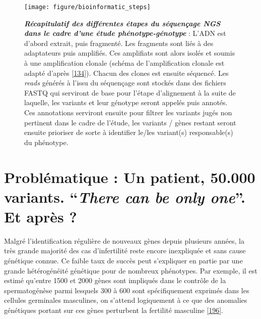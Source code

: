 \documentclass[12pt,a4paper,twoside]{ugathesis}
\theoremstyle{definition}
\theoremstyle{definition}
\theoremstyle{definition}
\theoremstyle{remark}
\begin{document}
\newpage 

\begin{figure}

{\centering \texttt{[image: figure/bioinformatic\_steps]} 

}

\caption[Récapitulatif des différentes étapes du séquençage NGS dans le cadre d'une étude phénotype-génotype]{\textbf{\emph{Récapitulatif des différentes
étapes du séquençage NGS dans le cadre d'une étude phénotype-génotype}}
: L'ADN est d'abord extrait, puis fragmenté. Les fragments sont liés à
des adaptateurs puis amplifiés. Ces amplifiats sont alors isolés et
soumis à une amplification clonale (schéma de l'amplification clonale
est adapté d'après {[}\protect\hyperlink{ref-Goodwin2016}{134}{]}).
Chacun des clones est ensuite séquencé. Les \emph{reads} générés à
l'issu du séquençage sont stockés dans des fichiers FASTQ qui serviront
de base pour l'étape d'alignement à la suite de laquelle, les variants
et leur génotype seront appelés puis annotés. Ces annotations serviront
ensuite pour filtrer les variants jugés non pertinent dans le cadre de
l'étude, les variants / gènes restant seront ensuite prioriser de sorte
à identifier le/les variant(s) responsable(s) du phénotype.}\label{fig:pictrecapngssteps}
\end{figure}















\newpage

\section{\texorpdfstring{Problématique : Un patient, 50.000 variants.
``\emph{There can be only one}''. Et après
?}{Problématique : Un patient, 50.000 variants. There can be only one. Et après ?}}\label{problematique-un-patient-50.000-variants.-there-can-be-only-one.-et-apres}

Malgré l'identification régulière de nouveaux gènes depuis plusieurs
années, la très grande majorité des cas d'infertilité reste encore
inexpliquée et sans cause génétique connue. Ce faible taux de succès
peut s'expliquer en partie par une grande hétérogénéité génétique pour
de nombreux phénotypes. Par exemple, il est estimé qu'entre 1500 et 2000
gènes sont impliqués dans le contrôle de la spermatogénèse parmi
lesquels 300 à 600 sont spécifiquement exprimés dans les cellules
germinales masculines, on s'attend logiquement à ce que des anomalies
génétiques portant sur ces gènes perturbent la fertilité masculine
{[}\protect\hyperlink{ref-Matzuk2008}{196}{]}.
\end{document}
